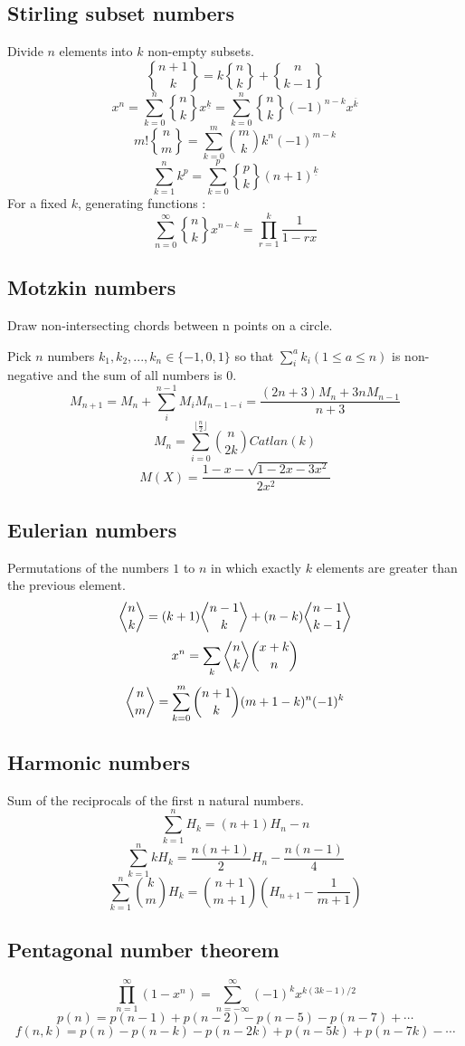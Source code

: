 	\subsection{Stirling subset numbers}
	Divide $n$ elements into $k$ non-empty subsets.
	\[ {n+1 \brace k} = k{n \brace k} + {n \brace k-1} \]
	\[ x^n = \sum_{k=0}^n{ {n \brace k}x^{\underline{k}} } = \sum_{k=0}^n{ {n \brace k}(-1)^{n-k}x^{\overline{k}} } \]
	\[ m!{n \brace m} = \sum_{k=0}^m{m \choose k}k^n(-1)^{m-k} \]
	\[ \sum_{k=1}^nk^p = \sum_{k=0}^p{p \brace k}(n+1)^{\underline{k}} \]
	For a fixed $k$, generating functions :
	\[\sum_{n=0}^{\infty}{n \brace k}x^{n-k}=\prod_{r=1}^{k}\frac{1}{1-rx}\]
	\subsection{Motzkin numbers}
	Draw non-intersecting chords between n points on a circle.

	Pick $n$ numbers $k_1,k_2,...,k_n\in\{-1,0,1\}$ so that $\sum_i^ak_i(1\leq a\leq n)$ is non-negative and the sum of all numbers is $0$.
	\[M_{n+1}=M_n+\sum_i^{n-1}M_iM_{n-1-i}=\frac{(2n+3)M_n+3nM_{n-1}}{n+3}\]
	\[M_n=\sum_{i=0}^{\lfloor \frac{n}{2}\rfloor}\binom{n}{2k}Catlan(k)\]
	\[M(X)=\frac{1-x-\sqrt{1-2x-3x^2}}{2x^2}\]
	\subsection{Eulerian numbers}

	\def \bangle{ \atopwithdelims \langle \rangle}

	Permutations of the numbers $1$ to $n$ in which exactly $k$ elements are greater than the previous element.
	\[ {n \bangle k} = (k+1){n-1 \bangle k} + (n-k){n-1 \bangle k-1} \]
	\[ x^n = \sum_k{ {n \bangle k}{x+k \choose n} } \]
	\[ {n \bangle m} = \sum_{k=0}^m{n+1 \choose k}(m+1-k)^n(-1)^k \]
	\subsection{Harmonic numbers}
	Sum of the reciprocals of the first n natural numbers.
	\[ \sum_{k=1}^nH_k = (n+1)H_n-n \]
	\[ \sum_{k=1}^nkH_k = \frac{n(n+1)}{2}H_n - \frac{n(n-1)}{4} \]
	\[ \sum_{k=1}^n{k \choose m}H_k = {n+1 \choose m+1}(H_{n+1} - \frac{1}{m+1}) \]
	\subsection{Pentagonal number theorem}
	\[ \prod_{n=1}^{\infty}(1-x^n) = \sum_{n=-\infty}^{\infty}{(-1)^kx^{k(3k-1)/2}} \]
	\[ p(n) = p(n-1)+p(n-2)-p(n-5)-p(n-7)+\cdots \]
	\[ f(n, k) = p(n)-p(n-k)-p(n-2k)+p(n-5k)+p(n-7k)-\cdots \]
